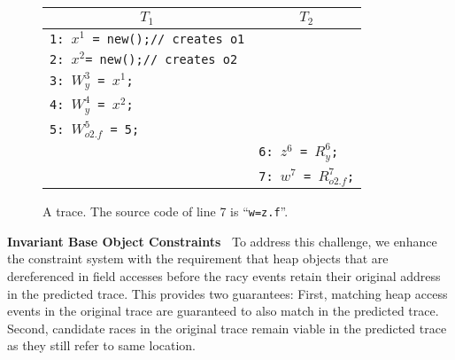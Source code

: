 \begin{figure}
{\small
	\centering
	\begin{tabular}{ll}
		\hline
		\multicolumn{1}{c}{$T_1$} & \multicolumn{1}{c}{$T_2$} \\
		\hline
		{\tt 1: $x^1$ = new();// creates o1} & \\
		{\tt 2: $x^2$= new();// creates o2} & \\
		{\tt 3: $W^3_{y}$ = $x^1$;} & \\
		{\tt 4: $W^4_{y}$ = $x^2$;} & \\
		{\tt 5: $W^5_{o2.f}$ = 5;} & \\	
		& {\tt 6: $z^6$ = $R^6_{y}$;} \\
		& {\tt 7: $w^7$ = $R^7_{o2.f}$;} \\
	\end{tabular}
	\caption{\label{fig:heapAccess} A trace. The source code of line 7 is
``{\tt w=z.f}''.}
}
\vspace{-0.15in}
\end{figure}

{\bf Invariant Base Object Constraints\ } To address this challenge, 
we enhance the constraint system with the requirement that heap objects 
that are dereferenced in field accesses before the racy events retain 
their original address in the predicted trace. This provides two
guarantees: First, matching heap access events in the original trace are 
guaranteed to also match in the predicted trace. Second, candidate races 
in the original trace remain viable in the predicted trace as they still 
refer to same location. 







